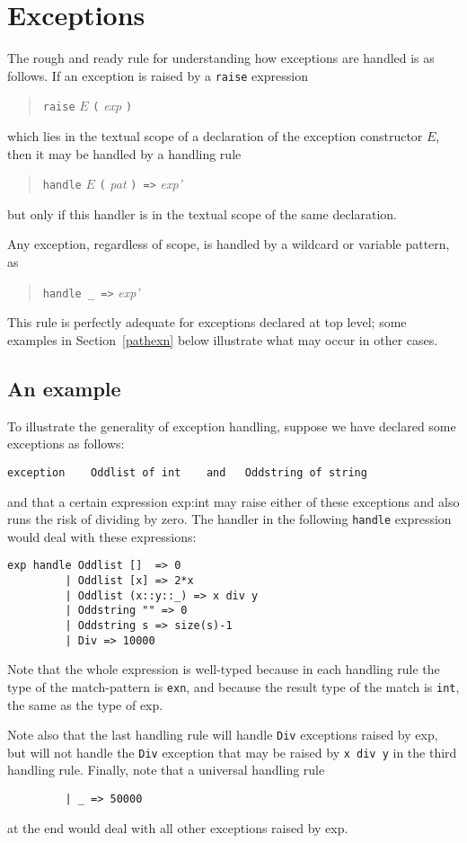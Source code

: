 \chapter{Exceptions}
\label{exception}
The rough and ready rule for understanding how exceptions are handled
is as follows.  If an exception is raised by a \verb"raise"
expression
\begin{quote}
\verb"raise" $E$ \verb"(" {\it exp} \verb")"
\end{quote}
which lies in the textual scope of a declaration of the exception
constructor $E$, then it may be handled by a handling rule
\begin{quote}
\verb"handle" $E$ \verb"(" {\it pat} \verb") =>" {\it exp'}
\end{quote}
but only if this handler is in the textual scope of the same
declaration.

Any exception, regardless of scope, is handled by a wildcard or
variable pattern, as
\begin{quote}
\verb"handle _ =>" {\it exp'}
\end{quote}
This rule is perfectly adequate for exceptions declared at top level;
some examples in Section~\ref{pathexn} below illustrate what may occur in other
cases.

\section{An example}
To illustrate the generality of exception handling,  suppose we have
declared some exceptions as follows:
\begin{verbatim}
exception    Oddlist of int    and   Oddstring of string
\end{verbatim}
and that a certain expression  exp:int  may raise either of these
exceptions and also runs the risk of dividing by zero.  The handler
in the following \verb"handle" expression would deal with these
expressions:
\begin{verbatim}
exp handle Oddlist []  => 0
         | Oddlist [x] => 2*x
         | Oddlist (x::y::_) => x div y
         | Oddstring "" => 0
         | Oddstring s => size(s)-1
         | Div => 10000
\end{verbatim}
Note that the whole expression is well-typed because in each handling
rule the type of the match-pattern is \verb"exn", and because the
result type of the match is \verb"int", the same as the type of exp.

Note also that the last handling rule will handle \verb"Div"
exceptions raised by exp, but will not handle the \verb"Div"
exception that may be raised by \verb"x div y" in the third handling
rule.  Finally, note that a universal handling rule
\begin{verbatim}
         | _ => 50000
\end{verbatim}
at the end would deal with all other exceptions raised by  exp.

